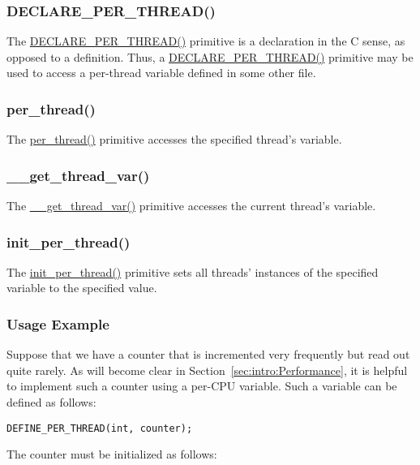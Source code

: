 \subsubsection{DECLARE\_PER\_THREAD()}

The \url{DECLARE_PER_THREAD()} primitive is a declaration in the C sense,
as opposed to a definition.
Thus, a \url{DECLARE_PER_THREAD()} primitive may be used to access
a per-thread variable defined in some other file.

\subsubsection{per\_thread()}

The \url{per_thread()} primitive accesses the specified thread's variable.

\subsubsection{\_\_get\_thread\_var()}

The \url{__get_thread_var()} primitive accesses the current thread's variable.

\subsubsection{init\_per\_thread()}

The \url{init_per_thread()} primitive sets all threads' instances of
the specified variable to the specified value.

\subsubsection{Usage Example}

Suppose that we have a counter that is incremented very frequently
but read out quite rarely.
As will become clear in
Section~\ref{sec:intro:Performance},
it is helpful to implement such a counter using a per-CPU variable.
Such a variable can be defined as follows:

\vspace{5pt}
\begin{minipage}[t]{\columnwidth}
\small 
\begin{verbatim}
DEFINE_PER_THREAD(int, counter);
\end{verbatim}
\end{minipage} 
\vspace{5pt}

The counter must be initialized as follows:

